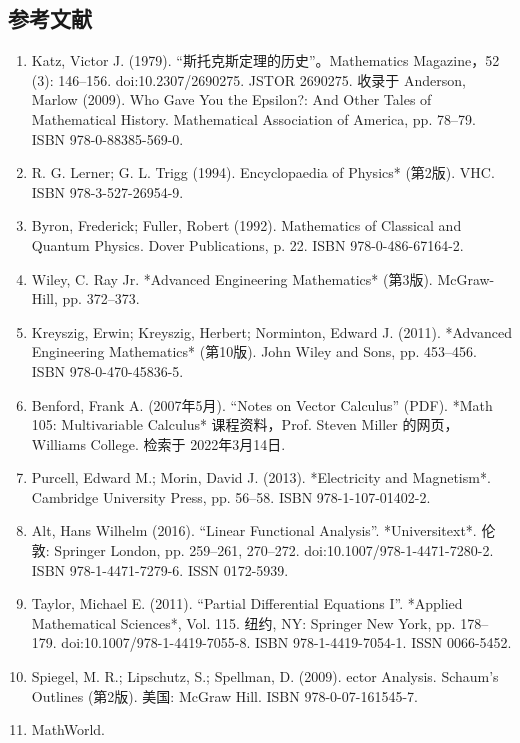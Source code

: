 \subsection{参考文献}
\begin{enumerate}
\item Katz, Victor J. (1979). “斯托克斯定理的历史”。Mathematics Magazine，52 (3): 146–156. doi:10.2307/2690275. JSTOR 2690275. 收录于 Anderson, Marlow (2009). Who Gave You the Epsilon?: And Other Tales of Mathematical History. Mathematical Association of America, pp. 78–79. ISBN 978-0-88385-569-0.
\item R. G. Lerner; G. L. Trigg (1994). Encyclopaedia of Physics* (第2版). VHC. ISBN 978-3-527-26954-9.
\item Byron, Frederick; Fuller, Robert (1992). Mathematics of Classical and Quantum Physics. Dover Publications, p. 22. ISBN 978-0-486-67164-2.
\item Wiley, C. Ray Jr. *Advanced Engineering Mathematics* (第3版). McGraw-Hill, pp. 372–373.
\item Kreyszig, Erwin; Kreyszig, Herbert; Norminton, Edward J. (2011). *Advanced Engineering Mathematics* (第10版). John Wiley and Sons, pp. 453–456. ISBN 978-0-470-45836-5.
\item Benford, Frank A. (2007年5月). “Notes on Vector Calculus” (PDF). *Math 105: Multivariable Calculus* 课程资料，Prof. Steven Miller 的网页，Williams College. 检索于 2022年3月14日.
\item Purcell, Edward M.; Morin, David J. (2013). *Electricity and Magnetism*. Cambridge University Press, pp. 56–58. ISBN 978-1-107-01402-2.
\item Alt, Hans Wilhelm (2016). “Linear Functional Analysis”. *Universitext*. 伦敦: Springer London, pp. 259–261, 270–272. doi:10.1007/978-1-4471-7280-2. ISBN 978-1-4471-7279-6. ISSN 0172-5939.
\item Taylor, Michael E. (2011). “Partial Differential Equations I”. *Applied Mathematical Sciences*, Vol. 115. 纽约, NY: Springer New York, pp. 178–179. doi:10.1007/978-1-4419-7055-8. ISBN 978-1-4419-7054-1. ISSN 0066-5452.
\item Spiegel, M. R.; Lipschutz, S.; Spellman, D. (2009). ector Analysis. Schaum's Outlines (第2版). 美国: McGraw Hill. ISBN 978-0-07-161545-7.
\item MathWorld.

\end{enumerate}